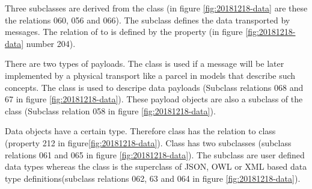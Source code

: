 Three subclasses are derived from the class  (in figure \ref{fig:20181218-data} are these the relations 060, 056 and 066). The subclass  defines the data transported by messages. The relation of  to  is defined by the property  (in figure \ref{fig:20181218-data} number 204).

There are two types of payloads. The class  is used if a message will be later implemented by a physical transport like a parcel in models that describe such concepts. The class  is used to descripe data payloads (Subclass relations 068 and 67 in figure \ref{fig:20181218-data}). These payload objects are also a subclass of the class  (Subclass relation 058 in figure \ref{fig:20181218-data}).

Data objects have a certain type. Therefore class  has the relation  to class  (property 212 in figure\ref{fig:20181218-data}). Class  has two subclasses (subclass relations 061 and 065 in figure \ref{fig:20181218-data}). The subclass  are user defined data types whereas the class  is the superclass of JSON, OWL or XML based data type definitions(subclass relations 062, 63 and 064 in figure \ref{fig:20181218-data}).